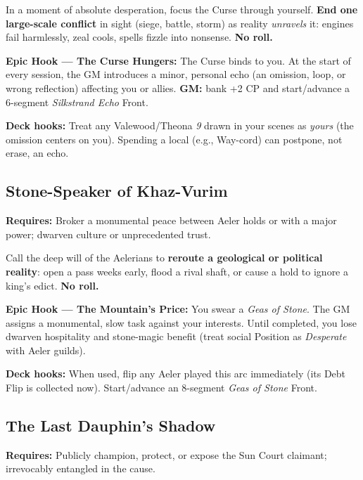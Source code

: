 \begin{tcolorbox}[enhanced,sharp corners,boxrule=.6pt,title={Talent — Laughter That Ends Sieges (20 XP, 1/campaign)}]
In a moment of absolute desperation, focus the Curse through yourself. \textbf{End one large-scale conflict} in sight (siege, battle, storm) as reality \emph{unravels} it: engines fail harmlessly, zeal cools, spells fizzle into nonsense. \textbf{No roll.}
\end{tcolorbox}

\textbf{Epic Hook — The Curse Hungers:} The Curse binds to you. At the start of every session, the GM introduces a minor, personal echo (an omission, loop, or wrong reflection) affecting you or allies. \textbf{GM:} bank +2 CP and start/advance a 6-segment \emph{Silkstrand Echo} Front.

\textbf{Deck hooks:} Treat any Valewood/Theona \emph{9} drawn in your scenes as \emph{yours} (the omission centers on you). Spending a local \SuitDiamond{} (e.g., Way-cord) can postpone, not erase, an echo.

\subsection{Stone-Speaker of Khaz-Vurim}
\textbf{Requires:} Broker a monumental peace between Aeler holds or with a major power; dwarven culture or unprecedented trust.

\begin{tcolorbox}[enhanced,sharp corners,boxrule=.6pt,title={Talent — Move the Mountain's Will (20 XP, 1/campaign)}]
Call the deep will of the Aelerians to \textbf{reroute a geological or political reality}: open a pass weeks early, flood a rival shaft, or cause a hold to ignore a king's edict. \textbf{No roll.}
\end{tcolorbox}

\textbf{Epic Hook — The Mountain's Price:} You swear a \emph{Geas of Stone}. The GM assigns a monumental, slow task against your interests. Until completed, you lose dwarven hospitality and stone-magic benefit (treat social Position as \emph{Desperate} with Aeler guilds).

\textbf{Deck hooks:} When used, flip any Aeler \SuitDiamond{} played this arc immediately (its Debt Flip is collected now). Start/advance an 8-segment \emph{Geas of Stone} Front.

\subsection{The Last Dauphin's Shadow}
\textbf{Requires:} Publicly champion, protect, or expose the Sun Court claimant; irrevocably entangled in the cause.


